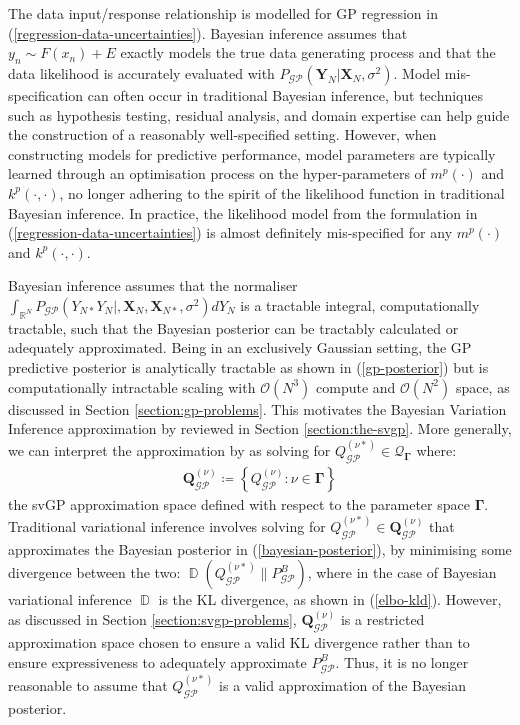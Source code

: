 \documentclass{article}
\newcommand{\D}{\operatorname{\mathbb{D}}}
\newcommand{\GP}{\operatorname{\mathcal{GP}}}
\numberwithin{equation}{section}
\begin{document}
 The data input/response relationship is modelled for GP regression in (\ref{regression-data-uncertainties}). Bayesian inference assumes that $y_n \sim F(x_n) + E$ exactly models the true data generating process and that the data likelihood is accurately evaluated with $P_{\GP}\left(\mathbf{Y}_N \vert \mathbf{X}_N, \sigma^2\right)$. Model mis-specification can often occur in traditional Bayesian inference, but techniques such as hypothesis testing, residual analysis, and domain expertise can help guide the construction of a reasonably well-specified setting. However, when constructing models for predictive performance, model parameters are typically learned through an optimisation process on the hyper-parameters of $m^p(\cdot)$ and $k^p(\cdot, \cdot)$, no longer adhering to the spirit of the likelihood function in traditional Bayesian inference. In practice, the likelihood model from the formulation in (\ref{regression-data-uncertainties}) is almost definitely mis-specified for any $m^p(\cdot)$ and $k^p(\cdot, \cdot)$.

Bayesian inference assumes that the normaliser $\int_{\mathbb{R}^{N}} P_{\GP}\left(Y_{N*} Y_N  \vert, \mathbf{X}_N, \mathbf{X}_{N*}, \sigma^2 \right) d Y_{N}$ is a tractable integral, computationally tractable, such that the Bayesian posterior can be tractably calculated or adequately approximated. Being in an exclusively Gaussian setting, the GP predictive posterior is analytically tractable as shown in (\ref{gp-posterior}) but is computationally intractable scaling with $\mathcal{O}(N^3)$ compute and $\mathcal{O}(N^2)$ space, as discussed in Section \ref{section:gp-problems}. This motivates the Bayesian Variation Inference approximation by \cite{titsias2009variational} reviewed in Section \ref{section:the-svgp}. More generally, we can interpret the approximation by \cite{titsias2009variational} as solving for $Q_{\GP}^{(\nu*)} \in \mathcal{Q}_{\mathbf{\Gamma}}$ where:
\begin{align}
    \boldsymbol{Q}_{\GP}^{(\nu)} \coloneqq \left\{Q_{\GP}^{(\nu)}: \nu \in \mathbf{\Gamma}\right\}
    \label{svgp-space}
\end{align}
the svGP approximation space defined with respect to the parameter space $\mathbf{\Gamma}$. Traditional variational inference involves solving for $Q_{\GP}^{(\nu*)} \in \boldsymbol{Q}_{\GP}^{(\nu)}$ that approximates the Bayesian posterior in (\ref{bayesian-posterior}), by minimising some divergence between the two: $\D\left(Q_{\GP}^{(\nu*)}\|P_{\GP}^B\right)$, where in the case of Bayesian variational inference $\D$ is the KL divergence, as shown in (\ref{elbo-kld}).
However, as discussed in Section \ref{section:svgp-problems}, $\boldsymbol{Q}_{\GP}^{(\nu)}$ is a restricted approximation space chosen to ensure a valid KL divergence rather than to ensure expressiveness to adequately approximate $P_{\GP}^B$. Thus, it is no longer reasonable to assume that $Q_{\GP}^{(\nu*)}$ is a valid approximation of the Bayesian posterior.
\end{document}

